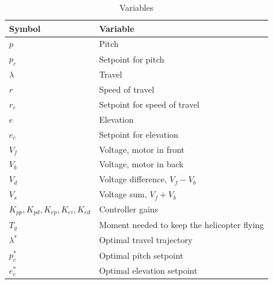 \begin{table}[ht]
    \centering
    \caption{Variables}
    \begin{tabular}{ll}
    \hline
    Symbol & Variable \\
    \hline
    $p$                    & Pitch \\
    $p_c$                  & Setpoint for pitch \\
    $\lambda$              & Travel \\
    $r$                    & Speed of travel \\
    $r_c$                  & Setpoint for speed of travel \\
    $e$                    & Elevation \\
    $e_c$                  & Setpoint for elevation \\
    $V_f$                  & Voltage, motor in front \\
    $V_b$                  & Voltage, motor in back \\
    $V_d$                  & Voltage difference, $V_f - V_b$ \\
    $V_s$                  & Voltage sum, $V_f + V_b$ \\
    $K_{pp},K_{pd},K_{ep},K_{ei}, K_{ed}$ & Controller gains \\
    $T_g$                  & Moment needed to keep the helicopter flying \\
    $\lambda^*$        & Optimal travel trajectory \\
    $p_c^*$               & Optimal pitch setpoint \\
    $e_c^*$               & Optimal elevation setpoint \\
    \hline
    \end{tabular}
    \label{tab:variables}
\end{table}
